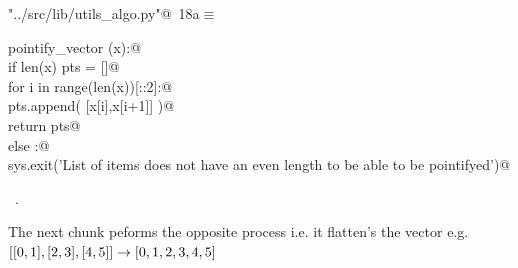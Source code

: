 \documentclass[11.5pt]{report}
\begin{document}
\begin{flushleft} \small
\begin{minipage}{\linewidth}\label{scrap13}\raggedright\small
{} \verb@"../src/lib/utils_algo.py"@\nobreak\ {\footnotesize {18a}}$\equiv$
\vspace{-1ex}
\begin{list}{}{} \item
\mbox{}\verb@def pointify_vector (x):@\\
\mbox{}\verb@    if len(x) % 2 == 0:@\\
\mbox{}\verb@        pts = []@\\
\mbox{}\verb@        for i in range(len(x))[::2]:@\\
\mbox{}\verb@            pts.append( [x[i],x[i+1]] )@\\
\mbox{}\verb@        return pts@\\
\mbox{}\verb@    else :@\\
\mbox{}\verb@        sys.exit('List of items does not have an even length to be able to be pointifyed')@\\
\mbox{}\verb@@{\NWsep}
\end{list}
\vspace{-1.5ex}
\footnotesize
\begin{list}{}{\setlength{\itemsep}{-\parsep}\setlength{\itemindent}{-\leftmargin}}
\item \NWtxtFileDefBy\ .

\item{}
\end{list}
\end{minipage}\vspace{4ex}
\end{flushleft}

\vspace{-0.8cm}
The next chunk peforms the opposite process i.e. it flatten's the vector
e.g. $[[0,1],[2,3],[4,5]] \rightarrow [0,1,2,3,4,5]$
\end{document}
